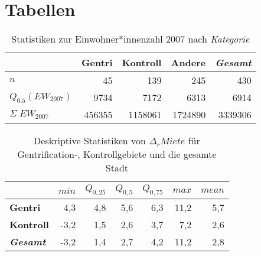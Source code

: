 \newpage
\section{Tabellen}

\begin{table}[H]
\centering
\begin{tabular}{@{}lrrrr@{}}
\toprule
                                       & \multicolumn{1}{r}{{\bf Gentri}} & \multicolumn{1}{r}{{\bf Kontroll}} & \multicolumn{1}{r}{{\bf Andere}} & \multicolumn{1}{r}{{\bf \textit{Gesamt}}} \\ \midrule
$n$                                    & 45                               & 139                                & 245                              & 430                                  \\
$Q_{0.5}(EW_{2007})$                   & 9734                             & 7172                               & 6313                             & 6914                                 \\
$\Sigma\;EW_{2007}$                    & 456355                           & 1158061                            & 1724890                          & 3339306                              \\ \bottomrule
\end{tabular}
\caption{Statistiken zur Einwohner*innenzahl 2007 nach \textit{Kategorie}}\label{tab:KategorieEW}
\end{table}            


\begin{table}[H]
\centering
\begin{tabular}{@{}lrrrrrr@{}}
\toprule
               & $min$ & $Q_{0,25}$ & $Q_{0,5}$ & $Q_{0,75}$ & $max$ & $mean$ \\ \midrule
{\bf Gentri}   &   4,3 & 4,8 & 5,6 &  6,3 & 11,2 & 5,7 \\
{\bf Kontroll} &  -3,2 & 1,5 & 2,6 &  3,7 &  7,2 & 2,6 \\ \hdashline 
{\bf \textit{Gesamt}} & -3,2 & 1,4 &  2,7 &  4,2 & 11,2 & 2,8 \\ \bottomrule
\end{tabular}
\caption[Deskriptive Statistiken von $\Delta_{r}Miete$]{Deskriptive Statistiken von $\Delta_{r}Miete$ für Gentrification-, Kontrollgebiete und die gesamte Stadt}
\label{tab:Mietechgr}
\end{table}

